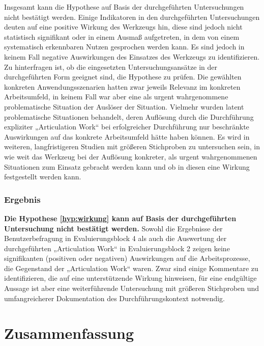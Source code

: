 Insgesamt kann die Hypothese auf Basis der durchgeführten Untersuchungen nicht bestätigt werden. Einige Indikatoren in den durchgeführten Untersuchungen deuten auf eine positive Wirkung des Werkzeugs hin, diese sind jedoch nicht statistisch signifikant oder in einem Ausmaß aufgetreten, in dem von einem systematisch erkennbaren Nutzen gesprochen werden kann. Es sind jedoch in keinem Fall negative Auswirkungen des Einsatzes des Werkzeugs zu identifizieren. Zu hinterfragen ist, ob die eingesetzten Untersuchungsansätze in der durchgeführten Form geeignet sind, die Hypothese zu prüfen. Die gewählten konkreten Anwendungsszenarien hatten zwar jeweils Relevanz im konkreten Arbeitsumfeld, in keinem Fall war aber eine als urgent wahrgenommene problematische Situation der Auslöser der Situation. Vielmehr wurden latent problematische Situationen behandelt, deren Auflösung durch die Durchführung expliziter „Articulation Work“ bei erfolgreicher Durchführung nur beschränkte Auswirkungen auf das konkrete Arbeitsumfeld hätte haben können. Es wird in weiteren, langfristigeren Studien mit größeren Stichproben zu untersuchen sein, in wie weit das Werkzeug bei der Auflösung konkreter, als urgent wahrgenommenen Situationen zum Einsatz gebracht werden kann und ob in diesen eine Wirkung festgestellt werden kann. 

\subsubsection{Ergebnis} 

\textbf{Die Hypothese \ref{hyp:wirkung} kann auf Basis der durchgeführten Untersuchung nicht bestätigt werden.} Sowohl die Ergebnisse der Benutzerbefragung in Evaluierungsblock 4 als auch die Auswertung der durchgeführten „Articulation Work“ in Evaluierungsblock 2 zeigen keine signifikanten (positiven oder negativen) Auswirkungen auf die Arbeitsprozesse, die Gegenstand der „Articulation Work“ waren. Zwar sind einige Kommentare zu identifizieren, die auf eine unterstützende Wirkung hinweisen, für eine endgültige Aussage ist aber eine weiterführende Untersuchung mit größeren Stichproben und umfangreicherer Dokumentation des Durchführungskontext notwendig. 


\section{Zusammenfassung} %
\label{sec:a_zusammenfassung}

